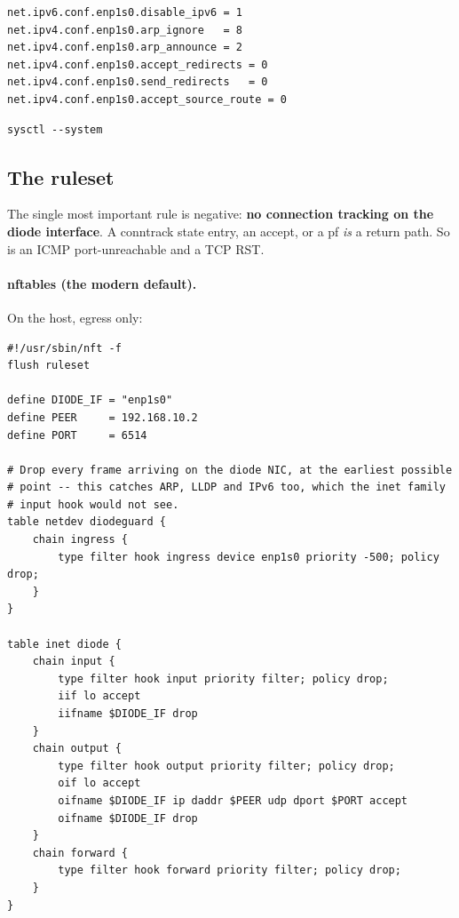 \documentclass[11pt,a4paper]{article}
\begin{document}
\begin{lstlisting}[style=conf,caption={\file{/etc/sysctl.d/90-diode.conf}}]
net.ipv6.conf.enp1s0.disable_ipv6 = 1
net.ipv4.conf.enp1s0.arp_ignore   = 8
net.ipv4.conf.enp1s0.arp_announce = 2
net.ipv4.conf.enp1s0.accept_redirects = 0
net.ipv4.conf.enp1s0.send_redirects   = 0
net.ipv4.conf.enp1s0.accept_source_route = 0
\end{lstlisting}

\begin{lstlisting}[style=shell]
sysctl --system
\end{lstlisting}

\subsection{The ruleset}

The single most important rule is negative: \textbf{no connection tracking on
the diode interface}. A conntrack state entry, an 
accept, or a pf  \emph{is} a return path. So is an ICMP
port-unreachable and a TCP RST.

\paragraph{nftables (the modern default).} On the \srcside{} host, egress
only:

\begin{lstlisting}[style=nft,caption={\file{/etc/nftables.conf} --- SOURCE host}]
#!/usr/sbin/nft -f
flush ruleset

define DIODE_IF = "enp1s0"
define PEER     = 192.168.10.2
define PORT     = 6514

# Drop every frame arriving on the diode NIC, at the earliest possible
# point -- this catches ARP, LLDP and IPv6 too, which the inet family
# input hook would not see.
table netdev diodeguard {
    chain ingress {
        type filter hook ingress device enp1s0 priority -500; policy drop;
    }
}

table inet diode {
    chain input {
        type filter hook input priority filter; policy drop;
        iif lo accept
        iifname $DIODE_IF drop
    }
    chain output {
        type filter hook output priority filter; policy drop;
        oif lo accept
        oifname $DIODE_IF ip daddr $PEER udp dport $PORT accept
        oifname $DIODE_IF drop
    }
    chain forward {
        type filter hook forward priority filter; policy drop;
    }
}
\end{lstlisting}
\end{document}
